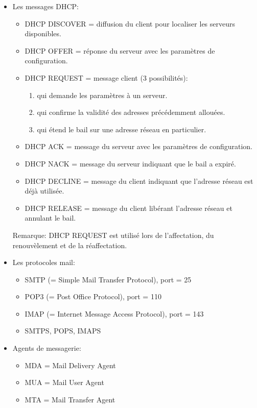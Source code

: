\documentclass[a4paper]{article}
\begin{document}
\begin{itemize}
\item Les messages DHCP:
\begin{itemize}
    \item DHCP DISCOVER = diffusion du client pour localiser les serveurs disponibles.
    \item DHCP OFFER = réponse du serveur avec les paramètres de configuration.
    \item DHCP REQUEST = message client (3 possibilités):
    \begin{enumerate}
        \item qui demande les paramètres à un serveur.
        \item qui confirme la validité des adresses précédemment allouées.
        \item qui étend le bail sur une adresse réseau en particulier.
    \end{enumerate}
    \item DHCP ACK = message du serveur avec les paramètres de configuration.
    \item DHCP NACK = message du serveur indiquant que le bail a expiré.
    \item DHCP DECLINE = message du client indiquant que l'adresse réseau est déjà utilisée.
    \item DHCP RELEASE = message du client libérant l'adresse réseau et annulant le bail.
\end{itemize}
Remarque: DHCP REQUEST est utilisé lors de l’affectation, du renouvèlement et de la réaffectation.





\item Les protocoles mail:
\begin{itemize}
    \item SMTP (= Simple Mail Transfer Protocol), port = 25
    \item POP3 (= Post Office Protocol), port = 110
    \item IMAP (= Internet Message Access Protocol), port = 143
    \item SMTPS, POPS, IMAPS
\end{itemize}





\item Agents de messagerie:
\begin{itemize}
    \item MDA = Mail Delivery Agent
    \item MUA = Mail User Agent
    \item MTA = Mail Transfer Agent
\end{itemize}






\end{itemize}
\end{document}

